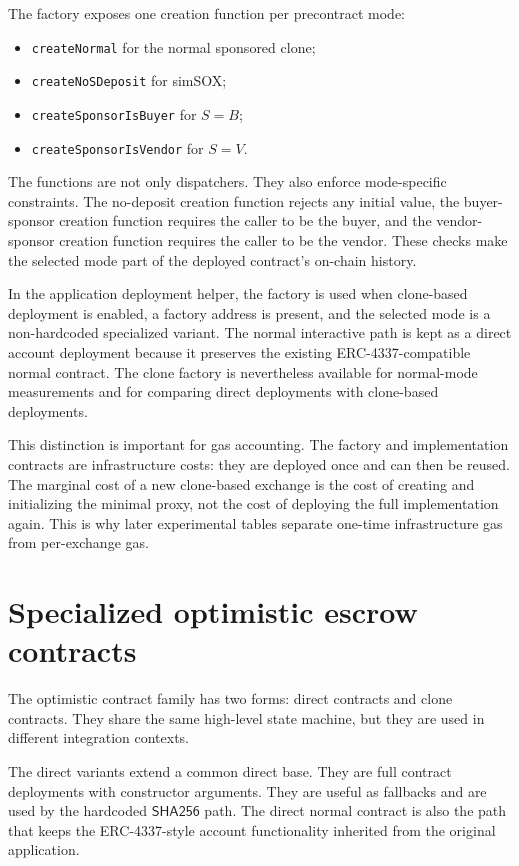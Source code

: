 The factory exposes one creation function per precontract mode:

\begin{itemize}
  \item \texttt{createNormal} for the normal sponsored clone;
  \item \texttt{createNoSDeposit} for simSOX;
  \item \texttt{createSponsorIsBuyer} for \(S=B\);
  \item \texttt{createSponsorIsVendor} for \(S=V\).
\end{itemize}

The functions are not only dispatchers. They also enforce mode-specific constraints. The
no-deposit creation function rejects any initial value, the buyer-sponsor creation function
requires the caller to be the buyer, and the vendor-sponsor creation function requires the
caller to be the vendor. These checks make the selected mode part of the deployed contract's
on-chain history.

In the application deployment helper, the factory is used when clone-based deployment is
enabled, a factory address is present, and the selected mode is a non-hardcoded specialized
variant. The normal interactive path is kept as a direct account deployment because it
preserves the existing ERC-4337-compatible normal contract. The clone factory is
nevertheless available for normal-mode measurements and for comparing direct deployments
with clone-based deployments.

This distinction is important for gas accounting. The factory and implementation contracts
are infrastructure costs: they are deployed once and can then be reused. The marginal cost
of a new clone-based exchange is the cost of creating and initializing the minimal proxy, not
the cost of deploying the full implementation again. This is why later experimental tables
separate one-time infrastructure gas from per-exchange gas.

\section{Specialized optimistic escrow contracts}

The optimistic contract family has two forms: direct contracts and clone contracts. They
share the same high-level state machine, but they are used in different integration contexts.

The direct variants extend a common direct base. They are full contract deployments with
constructor arguments. They are useful as fallbacks and are used by the hardcoded
\(\mathsf{SHA256}\) path. The direct normal contract is also the path that keeps the
ERC-4337-style account functionality inherited from the original application.

